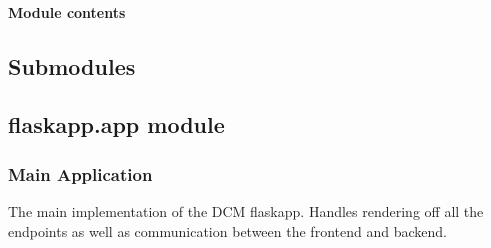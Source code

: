 \documentclass[letterpaper,10pt,english]{sphinxmanual}
\begin{document}
\begin{fulllineitems}

\begin{fulllineitems}
\label{\detokenize{flaskapp.tests:flaskapp.tests.test.FlaskTestCase.test_logout_works}}
\end{fulllineitems}


\begin{fulllineitems}
\label{\detokenize{flaskapp.tests:flaskapp.tests.test.FlaskTestCase.test_user_blocked}}
\end{fulllineitems}


\end{fulllineitems}



\paragraph{Module contents}
\label{\detokenize{flaskapp.tests:module-flaskapp.tests}}\label{\detokenize{flaskapp.tests:module-contents}}

\subsection{Submodules}
\label{\detokenize{flaskapp:submodules}}

\subsection{flaskapp.app module}
\label{\detokenize{flaskapp:module-flaskapp.app}}\label{\detokenize{flaskapp:flaskapp-app-module}}

\subsubsection{Main Application}
\label{\detokenize{flaskapp:main-application}}
The main implementation of the DCM flaskapp.
Handles rendering off all the endpoints as well
as communication between the frontend and
backend.
\end{document}
